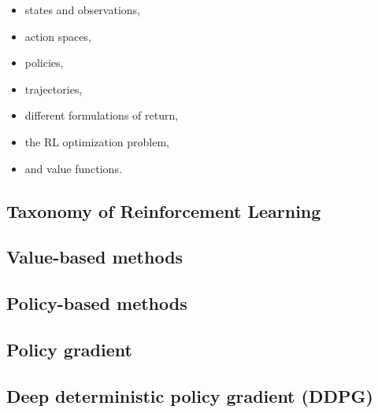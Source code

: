 

\begin{itemize}
    \item states and observations,
    \item action spaces,
    \item policies,
    \item trajectories,
    \item different formulations of return,
    \item the RL optimization problem,
    \item and value functions.
\end{itemize}

\subsection{Taxonomy of Reinforcement Learning}

\subsection{Value-based methods}

\subsection{Policy-based methods}

\subsection{Policy gradient}

\subsection{Deep deterministic policy gradient (DDPG)}
